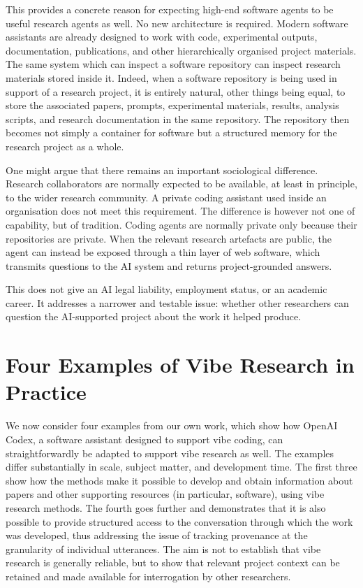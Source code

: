 \documentclass[12pt]{article}
\begin{document}
This provides a concrete reason for expecting high-end software agents to be useful research agents as well. No new architecture is required. Modern software assistants are already designed to work with code, experimental outputs, documentation, publications, and other hierarchically organised project materials. The same system which can inspect a software repository can inspect research materials stored inside it.
Indeed, when a software repository is being used in support of a research project, it is entirely natural, other things being equal, to store the associated papers, prompts, experimental materials, results, analysis scripts, and research documentation in the same repository. The repository then becomes not simply a container for software but a structured memory for the research project as a whole.

One might argue that there remains an important sociological difference. Research collaborators are normally expected to be available, at least in principle, to the wider research community. A private coding assistant used inside an organisation does not meet this requirement. The difference is however not one of capability, but of tradition. Coding agents are normally private only because their repositories are private. When the relevant research artefacts are public, the agent can instead be exposed through a thin layer of web software, which transmits questions to the AI system and returns project-grounded answers.

This does not give an AI legal liability, employment status, or an academic career. It addresses a narrower and testable issue: whether other researchers can question the AI-supported project about the work it helped produce.

\section{Four Examples of Vibe Research in Practice}

We now consider four examples from our own work, which show how OpenAI Codex, a software assistant designed to support vibe coding, can straightforwardly be adapted to support vibe research as well. The examples differ substantially in scale, subject matter, and development time. The first three show how the methods make it possible to develop and obtain information about papers and other supporting resources (in particular, software), using vibe research methods. The fourth goes further and demonstrates that it is also possible to provide structured access to the conversation through which the work was developed, thus addressing the issue of tracking provenance at the granularity of individual utterances. The aim is not to establish that vibe research is generally reliable, but to show that relevant project context can be retained and made available for interrogation by other researchers.
\end{document}

